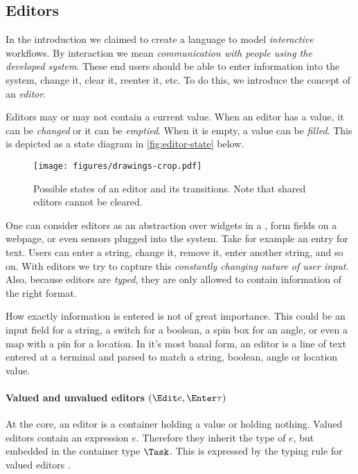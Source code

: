 \subsection{Editors}

In the introduction we claimed to create a language to model \emph{interactive} workflows.
By interaction we mean \emph{communication with people using the developed system}.
These end users should be able to enter information into the system,
change it, clear it, reenter it, etc.
To do this, we introduce the concept of an \emph{editor}.

Editors may or may not contain a current value.
When an editor has a value, it can be \emph{changed} or it can be \emph{emptied}.
When it is empty, a value can be \emph{filled}.
This is depicted as a state diagram in \autoref{fig:editor-state} below.

\begin{figure}[h]
  \centering
  \texttt{[image: figures/drawings-crop.pdf]}
  \caption{
    Possible states of an editor and its transitions.
    Note that shared editors cannot be cleared.
  }
  \label{fig:editor-state}
\end{figure}

One can consider editors as an abstraction over widgets in a \GUI,
form fields on a webpage,
or even sensors plugged into the system.
Take for example an entry for text.
Users can enter a string, change it, remove it, enter another string, and so on.
With editors we try to capture this \emph{constantly changing nature of user input}.
Also, because editors are \emph{typed},
they are only allowed to contain information of the right format.

How exactly information is entered is not of great importance.
This could be an input field for a string,
a switch for a boolean,
a spin box for an angle,
or even a map with a pin for a location.
In it's most banal form,
an editor is a line of text entered at a terminal and parsed to match
a string, boolean, angle or location value.



\paragraph{Valued and unvalued editors $(\Edit e, \Enter \tau)$}

At the core,
an editor is a container holding a value
or holding nothing.
Valued editors contain an expression $e$.
Therefore they inherit the type of $e$,
but embedded in the container type $\Task$.
This is expressed by the typing rule for valued editors .

